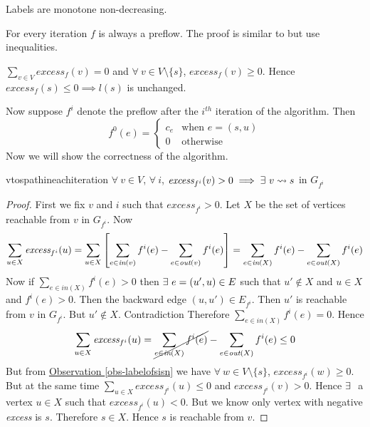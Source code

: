\begin{observation}\label{obs-labelsmonotone}
	Labels are monotone non-decreasing.
\end{observation}
\begin{observation}\label{obs-everyiterationpreflow}
	For every iteration $f$ is always a preflow. The proof is similar to  but use inequalities.
\end{observation}
\begin{observation}\label{obs-labelofsisn}
	$\sum\limits_{v\in V}\textit{excess}_f(v)=0$  and $\forall\ v\in V\setminus \{s\}$, $\textit{excess}_f(v)\geq 0$. Hence $\textit{excess}_f(s)\leq 0\implies l(s)$ is unchanged.
\end{observation}

Now suppose $f^i$ denote the preflow after the $i^{th}$ iteration of the algorithm. Then $$f^0(e)=\begin{cases}
		c_e & \text{when $e=(s,u)$} \\ 0 & \text{otherwise}
	\end{cases}$$
Now we will show the correctness of the algorithm.
\begin{lemma}{}{vtospathineachiteration}
	$\forall\ v\in V$, $\forall\ i$, $\textit{excess}_{f^i}(v)>0\implies\exs\ v\rightsquigarrow s$ in $G_{f^i}$
\end{lemma}
\begin{proof}
	First we fix $v$ and $i$ such that $\textit{excess}_{f^i}>0$. Let $X$ be the set of vertices reachable from $v$ in $G_{f^i}$. Now
	$$
		\sum_{u\in X}\textit{excess}_{f^i}(u) =\sum_{u\in X}\left[ \sum_{e\in \textit{in}(v)}f^i(e)-\sum_{e\in\textit{out}(v)}f^i(e) \right]= \sum_{e\in \textit{in}(X)}f^{i}(e)-\sum_{e\in\textit{out}{(X)}}f^{i}(e)$$
	Now if $\sum\limits_{e\in \textit{in}(X)}f^{i}(e)>0$ then $\exists\ e=(u',u)\in E$ such that $u'\notin X$ and $u\in X$ and $f^{i}(e)>0$. Then the backward edge $(u,u')\in E_{f^i}$. Then $u'$ is reachable from $v$ in $G_{f^i}$. But $u'\notin X$. Contradiction \ctr Therefore $\sum\limits_{e\in \textit{in}(X)}  f^{i}(e)=0$. Hence $$\sum_{u\in X}  \textit{excess}_{f^i}(u)= \cancel{\sum_{e\in \textit{in}(X)}f^{i}(e)}-\sum_{e\in\textit{out}{(X)}}f^{i}(e)\leq 0$$But from \hyperref[obs-labelofsisn]{Observation \ref{obs-labelofsisn}}  we have $\forall\ w\in V\setminus\{s\}$, $\textit{excess}_{f^i}(w)\geq 0$. But at the same time $\sum\limits_{u\in X}  \textit{excess}_{f^i}(u)\leq 0$ and $\textit{excess}_{f^i}(v)>0$. Hence $\exists\ $ a vertex $u\in X$ such that $\textit{excess}_{f^i}(u)< 0$. But we know only vertex with negative \textit{excess} is $s$. Therefore $s\in X$. Hence $s$ is reachable from $v$.
\end{proof}
